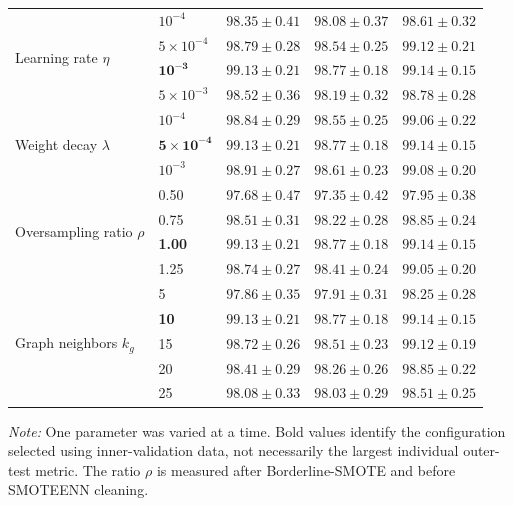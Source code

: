 \documentclass[pdflatex,sn-mathphys-num]{sn-jnl}%
\theoremstyle{thmstyleone}%
\theoremstyle{thmstyletwo}%
\theoremstyle{thmstylethree}%
\begin{document}
\begin{table}[!ht]
\begin{tabular}{@{}llccc@{}}
\multirow{4}{*}{Learning rate \(\eta\)}
& \(10^{-4}\)
& $98.35\pm0.41$ & $98.08\pm0.37$ & $98.61\pm0.32$ \\
& \(5\times10^{-4}\)
& $98.79\pm0.28$ & $98.54\pm0.25$ & $99.12\pm0.21$ \\
& \(\mathbf{10^{-3}}\)
& \textbf{$99.13\pm0.21$}
& \textbf{$98.77\pm0.18$}
& \textbf{$99.14\pm0.15$} \\
& \(5\times10^{-3}\)
& $98.52\pm0.36$ & $98.19\pm0.32$ & $98.78\pm0.28$ \\
\midrule

\multirow{3}{*}{Weight decay \(\lambda\)}
& \(10^{-4}\)
& $98.84\pm0.29$ & $98.55\pm0.25$ & $99.06\pm0.22$ \\
& \(\mathbf{5\times10^{-4}}\)
& \textbf{$99.13\pm0.21$}
& \textbf{$98.77\pm0.18$}
& \textbf{$99.14\pm0.15$} \\
& \(10^{-3}\)
& $98.91\pm0.27$ & $98.61\pm0.23$ & $99.08\pm0.20$ \\
\midrule

\multirow{4}{*}{Oversampling ratio \(\rho\)}
& 0.50
& $97.68\pm0.47$ & $97.35\pm0.42$ & $97.95\pm0.38$ \\
& 0.75
& $98.51\pm0.31$ & $98.22\pm0.28$ & $98.85\pm0.24$ \\
& \textbf{1.00}
& \textbf{$99.13\pm0.21$}
& \textbf{$98.77\pm0.18$}
& \textbf{$99.14\pm0.15$} \\
& 1.25
& $98.74\pm0.27$ & $98.41\pm0.24$ & $99.05\pm0.20$ \\
\midrule

\multirow{5}{*}{Graph neighbors \(k_g\)}
& 5
& $97.86\pm0.35$ & $97.91\pm0.31$ & $98.25\pm0.28$ \\
& \textbf{10}
& \textbf{$99.13\pm0.21$}
& \textbf{$98.77\pm0.18$}
& \textbf{$99.14\pm0.15$} \\
& 15
& $98.72\pm0.26$ & $98.51\pm0.23$ & $99.12\pm0.19$ \\
& 20
& $98.41\pm0.29$ & $98.26\pm0.26$ & $98.85\pm0.22$ \\
& 25
& $98.08\pm0.33$ & $98.03\pm0.29$ & $98.51\pm0.25$ \\
\bottomrule
\end{tabular}

\vspace{2pt}
\begin{minipage}{0.97\textwidth}
\footnotesize
\textit{Note:} One parameter was varied at a time. Bold values identify the
configuration selected using inner-validation data, not necessarily the
largest individual outer-test metric. The ratio \(\rho\) is measured after
Borderline-SMOTE and before SMOTEENN cleaning.
\end{minipage}
\end{table}
\endgroup
\end{document}
